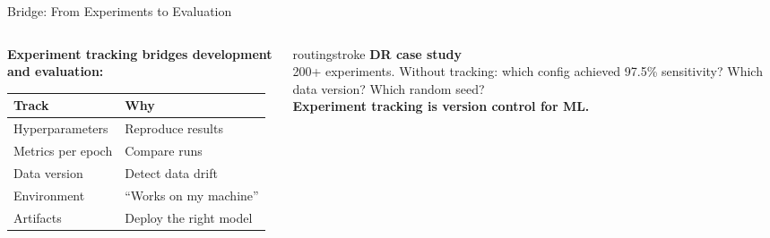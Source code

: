 \documentclass[aspectratio=169, 12pt]{beamer}
\begin{document}
\begin{frame}{Bridge: From Experiments to Evaluation}
\note{
%
%
%
%
}

\small
\begin{columns}[T]
  \begin{column}{0.50\textwidth}
    \textbf{Experiment tracking bridges development and evaluation:}

    \vspace{0.1cm}
    {\footnotesize
    \begin{tabular}{@{}ll@{}}
      \toprule
      \textbf{Track} & \textbf{Why} \\
      \midrule
      Hyperparameters & Reproduce results \\
      Metrics per epoch & Compare runs \\
      Data version    & Detect data drift \\
      Environment     & ``Works on my machine'' \\
      Artifacts       & Deploy the right model \\
      \bottomrule
    \end{tabular}
    }

    \vspace{0.1cm}
  \end{column}
  \begin{column}{0.46\textwidth}
    \vspace{0.2cm}
    \begin{mlsyscard}{routingstroke}
    \textbf{DR case study}\\[0.1cm]
    {\footnotesize 200+ experiments. Without tracking: which config achieved 97.5\% sensitivity? Which data version? Which random seed?\\[0.1cm]
    \textbf{Experiment tracking is version control for ML.}}
    \end{mlsyscard}
  \end{column}
\end{columns}


\end{frame}
\end{document}
